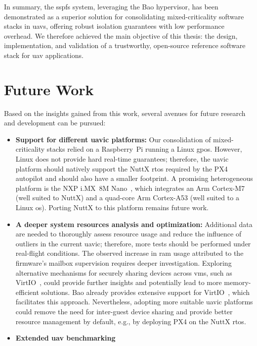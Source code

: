 In summary, the \gls{sspfs} system, leveraging the Bao hypervisor, has been
demonstrated as a superior solution for consolidating mixed-criticality software
stacks in \glspl{uav}, offering robust isolation guarantees with low performance
overhead. We therefore achieved the main objective of this thesis: the design,
implementation, and validation of a trustworthy, open-source reference software
stack for \gls{uav} applications.

\section{Future Work}
Based on the insights gained from this work, several
avenues for future research and development can be
pursued:
\begin{itemize}
\item \textbf{Support for different \gls{uavic} platforms:}
Our consolidation of mixed-criticality stacks relied on a Raspberry~Pi running a
Linux \gls{gpos}. However, Linux does not provide hard real-time guarantees;
therefore, the \gls{uavic} platform should natively support the NuttX \gls{rtos}
required by the PX4 autopilot and should also have a smaller footprint. A
promising heterogeneous platform is the NXP i.MX~8M Nano~\cite{imx8mn}, which
integrates an Arm Cortex-M7 (well suited to NuttX) and a quad-core Arm
Cortex-A53 (well suited to a Linux \gls{os}). Porting NuttX to this platform
remains future work.
\item \textbf{A deeper system resources analysis and optimization:}
  Additional data are needed to thoroughly assess resource usage and reduce the
  influence of outliers in the current \gls{uavic}; therefore, more tests should
  be performed under real-flight conditions.
  The observed increase
  in \gls{ram} usage attributed to the firmware's mailbox supervision requires
  deeper investigation. Exploring alternative mechanisms for securely sharing
  devices across \glspl{vm}, such as VirtIO~\cite{peixoto-virtio-2024}, could provide further insights and
  potentially lead to more memory-efficient solutions. Bao already provides
  extensive support for
  VirtIO~\cite{costa2022virtio,ribeiro2023virtio,peixoto-virtio-2024,baoRepo},
  which facilitates this approach. Nevertheless, adopting more suitable
  \gls{uavic} platforms could remove the need for inter-guest device sharing and
  provide better resource management by default, e.g., by deploying PX4
  on the NuttX \gls{rtos}.
\item \textbf{Extended \gls{uav} benchmarking}

\end{itemize}
